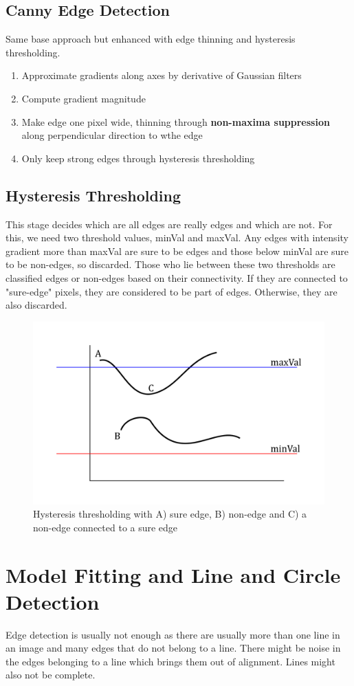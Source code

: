 \documentclass[11pt]{article}
\theoremstyle{definition}
\begin{document}
\subsection{Canny Edge Detection}
Same base approach but enhanced with edge thinning and hysteresis thresholding.
\begin{enumerate}
	\item Approximate gradients along axes by derivative of Gaussian filters
	\item Compute gradient magnitude
	\item Make edge one pixel wide, thinning through \textbf{non-maxima suppression} along perpendicular direction to wthe edge
	\item Only keep strong edges through hysteresis thresholding 
\end{enumerate}

\subsection{Hysteresis Thresholding}
This stage decides which are all edges are really edges and which are not. For this, we need two threshold values, minVal and maxVal. Any edges with intensity gradient more than maxVal are sure to be edges and those below minVal are sure to be non-edges, so discarded. Those who lie between these two thresholds are classified edges or non-edges based on their connectivity. If they are connected to "sure-edge" pixels, they are considered to be part of edges. Otherwise, they are also discarded.
	
\begin{figure}[H]
	\centering
	\includegraphics[keepaspectratio,width=0.6\linewidth]{hysteresis_thresholding}
	\caption{Hysteresis thresholding with A) sure edge, B) non-edge and C) a non-edge connected to a sure edge}
\end{figure}

\section{Model Fitting and Line and Circle Detection}
Edge detection is usually not enough as there are usually more than one line in an image and many edges that do not belong to a line. There might be noise in the edges belonging to a line which brings them out of alignment. Lines might also not be complete.
\end{document}
